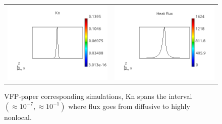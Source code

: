 \documentclass[review]{elsarticle}
\begin{document}
\begin{figure}[tbh]
\begin{center}
\begin{tabular}{cc}
      \includegraphics[width=\psize\textwidth]{figs/Kn_p51D1e8.png} &
      \includegraphics[width=\psize\textwidth]{figs/hflux_p51D1e8.png} 
    \end{tabular}
  \caption{
	VFP-paper corresponding simulations, Kn spans the interval 
	$(\approx 10^{-7}, \approx 10^{-1})$ where flux goes from diffusive to
	highly nonlocal.
  }
  \end{center}
  \label{fig:p5_Kn_hflux}
\end{figure}
\end{document}
